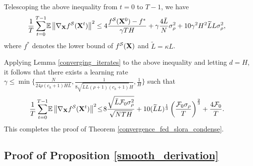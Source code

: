 \documentclass{article} %
\theoremstyle{plain}
\theoremstyle{definition}
\begin{document}
Telescoping the above inequality from \(t=0\) to \(T-1\), we have
\begin{align}
 \frac{1}{T}\sum_{t=0}^{T-1} \!\mathbb{E} \left\| \nabla_{\bf X} f^{\mathcal{S}} ({\bf X}^t) \right\|^2  \leq 4 \frac{ f^{\mathcal{S}}({\bf X}^0)  -  f^*}{\gamma TH}  + \gamma \frac{4 \bar{L}}{N} \sigma_{\rho}^2 + 10 \gamma^2 H^2 \widetilde{L} L \sigma_{\rho}^2,
\end{align}
where $f^*$ denotes the lower bound of $f^{\mathcal{S}}({\bf X})$ and $\widetilde{L} = \kappa L$. 


Applying Lemma \ref{converging_iterates} to the above inequality and letting $d=H$, 
it follows that there exists a learning rate $\gamma \leq \min \{\frac{N}{24 \rho (c_h + 1) H\bar{L}}, \frac{1}{8\sqrt{\widetilde{L} L (\rho+1) (c_h +1)} H}, \frac{1}{H}\}$ such that
$$
\frac{1}{T}\sum_{t=0}^{T-1} \!\mathbb{E} \left\| \nabla_{\bf X} f^{\mathcal{S}} ({\bf X}^t) \right\|^2 \! \leq \! 8 \frac{\sqrt{\bar{L} \mathcal{F}_0 \sigma_{\rho}^2} }{\sqrt{N TH}} +
    10 (\widetilde{L} L)^{\frac{1}{3}} \left(\frac{\mathcal{F}_0 \sigma_{\rho}}{ T}\right)^{\frac{2}{3}} + \frac{4 \mathcal{F}_0 }{T}.
$$
This completes the proof of Theorem \ref{convergence_fed_slora_condense}.

\subsection{Proof of Proposition  \ref{smooth_derivation}}\label{proof_smooth}


\end{document}
